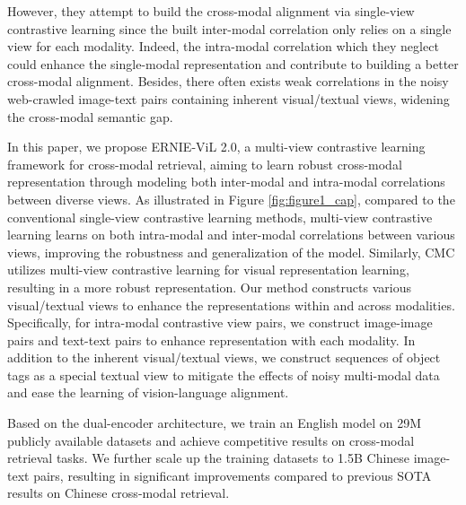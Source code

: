 \documentclass{article}
\begin{document}
However, they attempt to build the cross-modal alignment via single-view contrastive learning since the built inter-modal correlation only relies on a single view for each modality. Indeed, the intra-modal correlation which they neglect could enhance the single-modal representation and contribute to building a better cross-modal alignment. Besides, there often exists weak correlations in the noisy web-crawled image-text pairs containing inherent visual/textual views, widening the cross-modal semantic gap.


In this paper, we propose ERNIE-ViL 2.0, a multi-view contrastive learning framework for cross-modal retrieval, aiming to learn robust cross-modal representation through modeling both inter-modal and intra-modal correlations between diverse views. As illustrated in Figure \ref{fig:figure1_cap}, compared to the conventional single-view contrastive learning methods, multi-view contrastive learning learns on both intra-modal and inter-modal correlations between various views, improving the robustness and generalization of the model. Similarly, CMC \cite{Tian2020ContrastiveMC} utilizes multi-view contrastive learning for visual representation learning, resulting in a more robust representation. Our method constructs various visual/textual views to enhance the representations within and across modalities. Specifically, for intra-modal contrastive view pairs, we construct image-image pairs and text-text pairs to enhance representation with each modality. In addition to the inherent visual/textual views, we construct sequences of object tags as a special textual view to mitigate the effects of noisy multi-modal data and ease the learning of vision-language alignment. 


Based on the dual-encoder architecture, we train an English model on 29M publicly available datasets and achieve competitive results on cross-modal retrieval tasks. We further scale up the training datasets to 1.5B Chinese image-text pairs, resulting in significant improvements compared to previous SOTA results on Chinese cross-modal retrieval.
\end{document}
